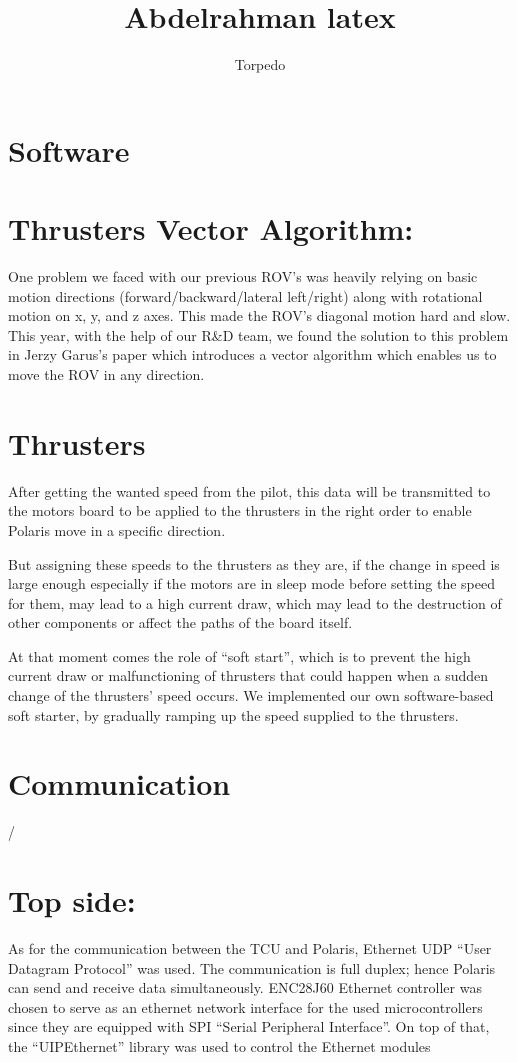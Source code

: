 \documentclass[a4paper,10pt]{article}
\title{Abdelrahman latex}
\author{Torpedo}
\begin{document}
	\maketitle
	\section*{\LARGE Software}
	\section{Thrusters Vector Algorithm:}	
		One problem we faced with our previous ROV’s was heavily
		relying on basic motion directions (forward/backward/lateral left/right)
		along with rotational motion on x, y, and z axes. This made the ROV’s 
		diagonal motion hard and slow. This year, with the help of our R\&D
		team, we found the solution to this problem in Jerzy Garus’s paper
		which introduces a vector algorithm which enables us to move the
		ROV in any direction.
	\section{Thrusters}
	\begin{flushleft}
		After getting the wanted speed from the pilot, this data will be transmitted to the motors board
		to be applied to the thrusters in the right order to enable Polaris move in a specific direction.  
		
		But assigning these speeds to the thrusters as they are, if the change in speed is large enough
		especially if the motors are in sleep mode before setting the speed for them, may lead to a high
		current draw, which may lead to the destruction of other components or affect the paths of the
		board itself.
		
		At that moment comes the role of “soft start”, which is to prevent the high current draw or
		malfunctioning of thrusters that could happen when a sudden change of the thrusters’ speed
		occurs. We implemented our own software-based soft starter, by gradually ramping up the
		speed supplied to the thrusters.
	\end{flushleft}
	
	\section*{\LARGE Communication}
	\setcounter{section}{0}
	\renewcommand{\thesection}{\Roman{section}}/
	\section{Top side:}	
		As for the communication between the TCU and Polaris, Ethernet UDP “User 
		Datagram Protocol” was used. The communication is full duplex; hence 
		Polaris can send and receive data simultaneously. ENC28J60 Ethernet 
		controller was chosen to serve as an ethernet network interface for the used 
		microcontrollers since they are equipped with SPI “Serial Peripheral 
		Interface”. On top of that, the “UIPEthernet” library was used to control the 
		Ethernet modules
\end{document}
